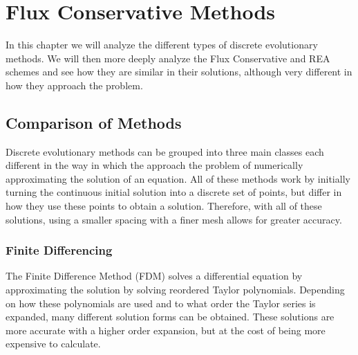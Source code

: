 \chapter{Flux Conservative Methods}
In this chapter we will analyze the different types of discrete evolutionary methods. We will then more deeply analyze the Flux Conservative and REA schemes and see how they are similar in  their solutions, although very different in how they approach the problem.
\section{Comparison of Methods}
Discrete evolutionary methods can be grouped into three main classes each different in the way in which the approach the problem of numerically approximating the solution of an equation. All of these methods work by initially turning the continuous initial solution into a discrete set of points, but differ in how they use these points to obtain a solution. Therefore, with all of these solutions, using a smaller spacing with a finer mesh allows for greater accuracy.
\subsection{Finite Differencing}
The Finite Difference Method (FDM) solves a differential equation by approximating the solution by solving reordered Taylor polynomials. Depending on how these polynomials are used and to what order the Taylor series is expanded, many different solution forms can be obtained. These solutions are more accurate with a higher order expansion, but at the cost of being more expensive to calculate.
